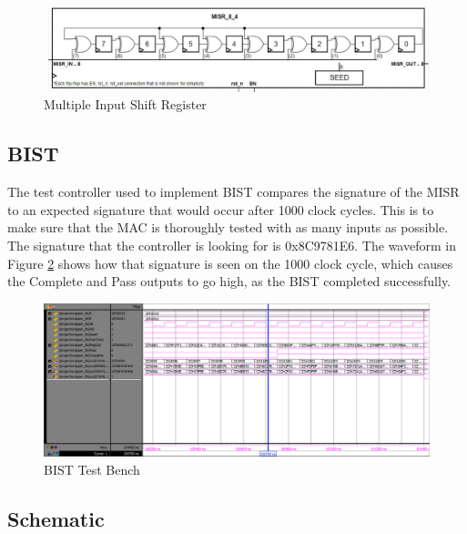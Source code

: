 \documentclass[11pt]{article}
\begin{document}
	
		\begin{figure}[H]
			\centering
			\includegraphics[width=\textwidth,height=\dimexpr\textheight-4\baselineskip-\abovecaptionskip-\belowcaptionskip\relax,keepaspectratio]{Pictures/MISR}
			\caption{Multiple Input Shift Register}
			\label{fig:misr-block}
		\end{figure}
	
	\subsection{BIST}
	
		The test controller used to implement BIST compares the signature of the MISR to an expected signature that would occur after 1000 clock cycles. This is to make sure that the MAC is thoroughly tested with as many inputs as possible. The signature that the controller is looking for is 0x8C9781E6. The waveform in Figure \ref{fig:BIST-Test-Bench} shows how that signature is seen on the 1000 clock cycle, which causes the Complete and Pass outputs to go high, as the BIST completed successfully.
	
		\begin{figure}[H] 
			\centering 
			\includegraphics[width=\textwidth,height=\dimexpr\textheight-4\baselineskip-\abovecaptionskip-\belowcaptionskip\relax,keepaspectratio]{"Pictures/BIST-Test-Bench"}
			\caption{BIST Test Bench} 
			\label{fig:BIST-Test-Bench} 
		\end{figure}
	
	\subsection{Schematic}
	
\end{document}
